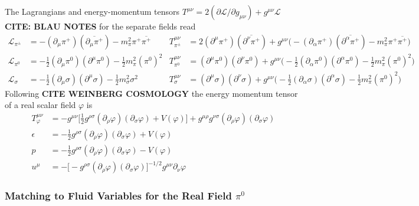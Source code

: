 The Lagrangians and energy-momentum tensors $T^{\mu\nu}=2(\partial\mathscr{L}/\partial g_{\mu\nu})+g^{\mu\nu}\mathscr{L}$ \textbf{CITE: BLAU NOTES} for the separate fields read
\begin{subequations}
    \begin{align}
        \mathscr{L}_{\pi^\pm}&=-(\partial_\mu\pi^+)(\overline{\partial_\mu\pi^+})-m_\pi^2\pi^+\overline{\pi^+}&T^{\mu\nu}_{\pi^\pm}&=2(\partial^\mu\pi^+)(\overline{\partial^\nu\pi^+})+g^{\mu\nu}\big(-(\partial_\alpha\pi^+)(\overline{\partial^\alpha\pi^+})-m_\pi^2\pi^+\overline{\pi^+}\big)\\
        \mathscr{L}_{\pi^0}&=-\frac{1}{2}(\partial_\mu\pi^0)(\partial^\mu\pi^0)-\frac{1}{2}m_\pi^2(\pi^0)^2&T^{\mu\nu}_{\pi^0}&=(\partial^\mu\pi^0)(\partial^\nu\pi^0)+g^{\mu\nu}\big(-\frac{1}{2}(\partial_\alpha\pi^0)(\partial^\alpha\pi^0)-\frac{1}{2}m_\pi^2(\pi^0)^2\big)\\
        \mathscr{L}_\sigma&=-\frac{1}{2}(\partial_\mu\sigma)(\partial^\mu\sigma)-\frac{1}{2}m_\sigma^2\sigma^2&T^{\mu\nu}_{\sigma}&=(\partial^\mu\sigma)(\partial^\nu\sigma)+g^{\mu\nu}\big(-\frac{1}{2}(\partial_\alpha\sigma)(\partial^\alpha\sigma)-\frac{1}{2}m_\pi^2(\pi^0)^2\big)
    \end{align}
\end{subequations}
Following \textbf{CITE WEINBERG COSMOLOGY} the energy momentum tensor of a real scalar field $\varphi$ is
\begin{subequations}
    \begin{align}
        T_\varphi^{\mu\nu}&=-g^{\mu\nu}\big[\frac{1}{2}g^{\rho\sigma}(\partial_\rho\varphi)(\partial_\sigma\varphi)+V(\varphi)\big]+g^{\mu\rho}g^{\nu\sigma}(\partial_\rho\varphi)(\partial_\sigma\varphi)\\
        \epsilon&=-\frac{1}{2}g^{\rho\sigma}(\partial_\rho\varphi)(\partial_\sigma\varphi)+V(\varphi)\\
        p&=-\frac{1}{2}g^{\rho\sigma}(\partial_\rho\varphi)(\partial_\sigma\varphi)-V(\varphi)\\
        u^\mu&=-\big[-g^{\rho\sigma}(\partial_\rho\varphi)(\partial_\sigma\varphi)\big]^{-1/2}g^{\mu\nu}\partial_\nu\varphi
    \end{align}
\end{subequations}
\subsubsection{Matching to Fluid Variables for the Real Field $\pi^0$}
\label{sec:FluidFromRealScalar}

